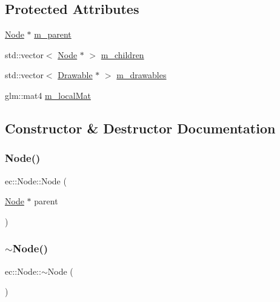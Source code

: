 \subsection*{Protected Attributes}
\begin{DoxyCompactItemize}
\item 
\mbox{\hyperlink{classec_1_1_node}{Node}} $\ast$ \mbox{\hyperlink{classec_1_1_node_a9f5373bd3ba5bfed53894223adcfe791}{m\+\_\+parent}}
\item 
std\+::vector$<$ \mbox{\hyperlink{classec_1_1_node}{Node}} $\ast$ $>$ \mbox{\hyperlink{classec_1_1_node_a648e1758013c7fc5899cbff2f8fe41fa}{m\+\_\+children}}
\item 
std\+::vector$<$ \mbox{\hyperlink{classec_1_1_drawable}{Drawable}} $\ast$ $>$ \mbox{\hyperlink{classec_1_1_node_aa9f624971a4906674148117ba4442c01}{m\+\_\+drawables}}
\item 
glm\+::mat4 \mbox{\hyperlink{classec_1_1_node_af8842c1cf2027d0890f8529c2fafaf2d}{m\+\_\+local\+Mat}}
\end{DoxyCompactItemize}


\subsection{Constructor \& Destructor Documentation}
\mbox{\label{classec_1_1_node_a99fb4715fbc3f193ad5ed88dff15cd0e}} 
\subsubsection{\texorpdfstring{Node()}{Node()}}
{\footnotesize\ttfamily ec\+::\+Node\+::\+Node (\begin{DoxyParamCaption}\item[{\mbox{\hyperlink{classec_1_1_node}{Node}} $\ast$}]{parent }\end{DoxyParamCaption})\hspace{0.3cm}{\ttfamily [explicit]}}

\mbox{\label{classec_1_1_node_a6b2dfa6d2490ec46a5d15a326780889b}} 
\subsubsection{\texorpdfstring{$\sim$\+Node()}{~Node()}}
{\footnotesize\ttfamily ec\+::\+Node\+::$\sim$\+Node (\begin{DoxyParamCaption}{ }\end{DoxyParamCaption})\hspace{0.3cm}{\ttfamily [virtual]}}



